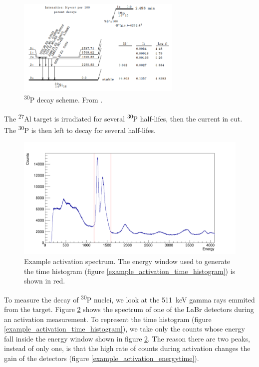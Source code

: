 \documentclass[a4paper,12pt]{report}
\newcommand{\Aliso}{\textsuperscript{27}Al }
\newcommand{\Piso}{\textsuperscript{30}P }
\begin{document}
\begin{figure}[H]
	\centering
	\includegraphics[width=0.7\textwidth]{Piso_decay_scheme.png}
	\caption{\Piso decay scheme.
	From \cite{nucleardatasheets}.}
	\label{Piso_decay_scheme}
\end{figure}

The \Aliso target is irradiated for several \Piso half-lifes, then the current in cut.
The \Piso is then left to decay for several half-lifes.

\begin{figure}[H]
	\centering
	\includegraphics[width=\textwidth]{example_activation_energy_histogram.png}
	\caption{Example activation spectrum.
	The energy window used to generate the time histogram (figure \ref{example_activation_time_histogram}) is shown in red.}
	\label{example_activation_energy_histogram}
\end{figure}

To measure the decay of \Piso nuclei, we look at the \qty{511}{\keV} gamma rays emmited from the target.
Figure \ref{example_activation_energy_histogram} shows the spectrum of one of the LaBr detectors during an activation measurement.
To represent the time histogram (figure \ref{example_activation_time_histogram}), we take only the counts whose energy fall inside the energy window shown in figure \ref{example_activation_energy_histogram}.
The reason there are two peaks, instead of only one, is that the high rate of counts during activation changes the gain of the detectors (figure \ref{example_activation_energytime}).
\end{document}
